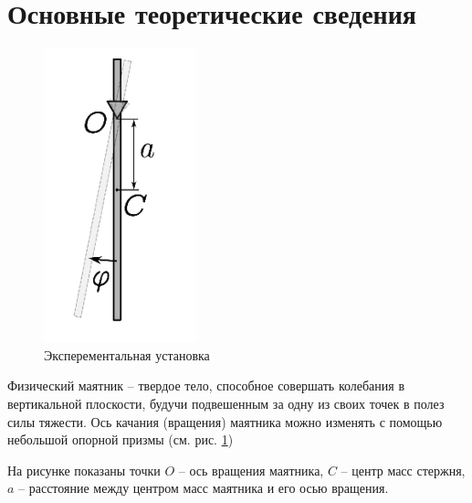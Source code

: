 \documentclass[a4paper,12pt]{article}
\begin{document}
	\section{Основные теоретические сведения}
	\begin{figure}
		\vspace{0mm}
		\centering
		\includegraphics[width=0.7\linewidth,angle=-0.6]{pen.png} 
		\caption{Эксперементальная установка}
		\label{fig:1}
	\end{figure}
	Физический маятник -- твердое тело, способное совершать колебания в вертикальной плоскости, будучи подвешенным за одну из своих точек в полез силы тяжести. Ось качания (вращения) маятника можно изменять с помощью небольшой опорной призмы (см. рис. \ref{fig:1})
	\vspace{2mm}
	
	\noindent
	На рисунке показаны точки $O$ -- ось вращения маятника, $C$ -- центр масс стержня, $a$ -- расстояние между центром масс маятника и его осью вращения. 
	\vspace{2mm}
	
\end{document}
